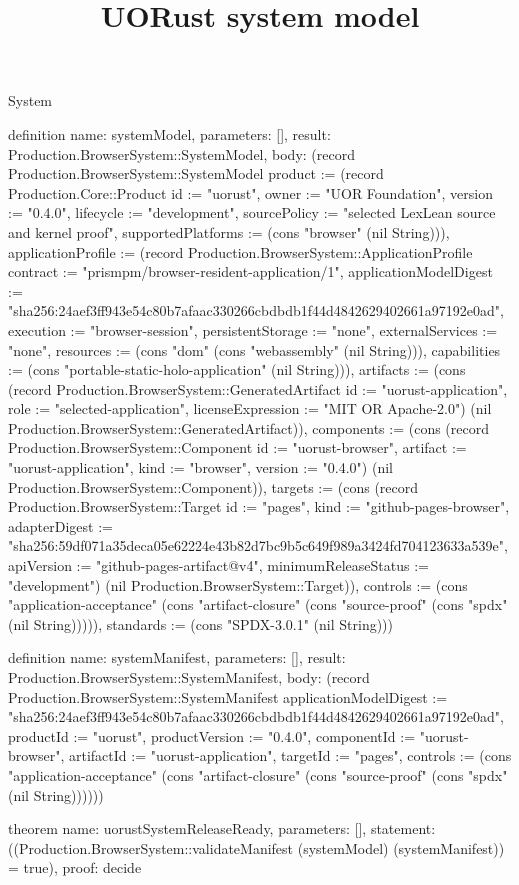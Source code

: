 \begin{lexlean}{System}
\title{UORust system model}
\begin{semanticmodule}
definition{
  name: systemModel,
  parameters: [],
  result: Production.BrowserSystem::SystemModel,
  body: (record Production.BrowserSystem::SystemModel {product := (record Production.Core::Product {id := "uorust", owner := "UOR Foundation", version := "0.4.0", lifecycle := "development", sourcePolicy := "selected LexLean source and kernel proof", supportedPlatforms := (cons "browser" (nil String))}), applicationProfile := (record Production.BrowserSystem::ApplicationProfile {contract := "prismpm/browser-resident-application/1", applicationModelDigest := "sha256:24aef3ff943e54c80b7afaac330266cbdbdb1f44d4842629402661a97192e0ad", execution := "browser-session", persistentStorage := "none", externalServices := "none", resources := (cons "dom" (cons "webassembly" (nil String))), capabilities := (cons "portable-static-holo-application" (nil String))}), artifacts := (cons (record Production.BrowserSystem::GeneratedArtifact {id := "uorust-application", role := "selected-application", licenseExpression := "MIT OR Apache-2.0"}) (nil Production.BrowserSystem::GeneratedArtifact)), components := (cons (record Production.BrowserSystem::Component {id := "uorust-browser", artifact := "uorust-application", kind := "browser", version := "0.4.0"}) (nil Production.BrowserSystem::Component)), targets := (cons (record Production.BrowserSystem::Target {id := "pages", kind := "github-pages-browser", adapterDigest := "sha256:59df071a35deca05e62224e43b82d7bc9b5c649f989a3424fd704123633a539e", apiVersion := "github-pages-artifact@v4", minimumReleaseStatus := "development"}) (nil Production.BrowserSystem::Target)), controls := (cons "application-acceptance" (cons "artifact-closure" (cons "source-proof" (cons "spdx" (nil String))))), standards := (cons "SPDX-3.0.1" (nil String))})
}

definition{
  name: systemManifest,
  parameters: [],
  result: Production.BrowserSystem::SystemManifest,
  body: (record Production.BrowserSystem::SystemManifest {applicationModelDigest := "sha256:24aef3ff943e54c80b7afaac330266cbdbdb1f44d4842629402661a97192e0ad", productId := "uorust", productVersion := "0.4.0", componentId := "uorust-browser", artifactId := "uorust-application", targetId := "pages", controls := (cons "application-acceptance" (cons "artifact-closure" (cons "source-proof" (cons "spdx" (nil String)))))})
}

theorem{
  name: uorustSystemReleaseReady,
  parameters: [],
  statement: ((Production.BrowserSystem::validateManifest (systemModel) (systemManifest)) = true),
  proof: decide{}
}
\end{semanticmodule}
\end{lexlean}

